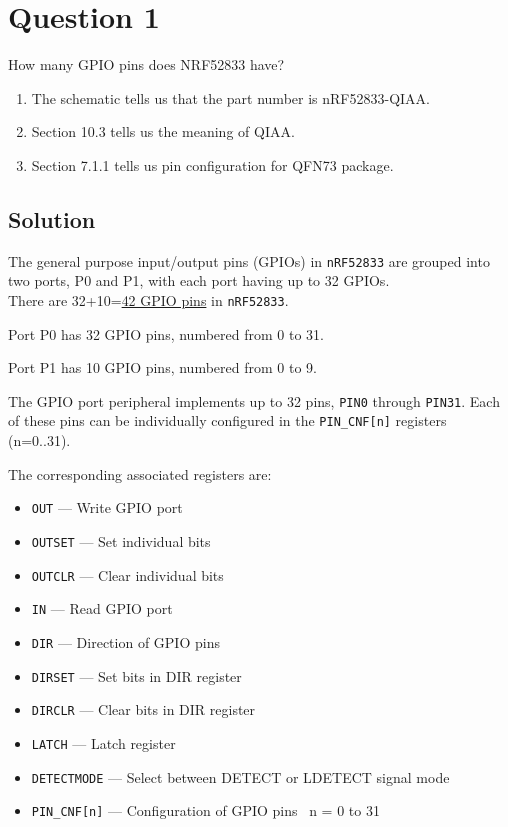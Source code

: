\section*{Question 1}

How many GPIO pins does NRF52833 have?
\begin{enumerate}[label= (\alph*)]
    \item The schematic tells us that the part number is nRF52833-QIAA.\@
    \item Section 10.3 tells us the meaning of QIAA.\@
    \item Section 7.1.1 tells us pin configuration for QFN73 package.
\end{enumerate}

\subsection*{Solution}

The general purpose input/output pins (GPIOs) in \texttt{nRF52833} are grouped into two ports, P0 and P1, with each port having up to 32 GPIOs.\\
There are 32+10=\underline{42 GPIO pins} in \texttt{nRF52833}.

Port P0 has 32 GPIO pins, numbered from 0 to 31.

Port P1 has 10 GPIO pins, numbered from 0 to 9.

The GPIO port peripheral implements up to 32 pins, \texttt{PIN0} through \texttt{PIN31}.
Each of these pins can be individually configured in the \texttt{PIN\_CNF[n]} registers (n=0..31).

The corresponding associated registers are:
\begin{itemize}
    \item \texttt{OUT} --- Write GPIO port
    \item \texttt{OUTSET} --- Set individual bits
    \item \texttt{OUTCLR} --- Clear individual bits
    \item \texttt{IN} --- Read GPIO port
    \item \texttt{DIR} --- Direction of GPIO pins
    \item \texttt{DIRSET} --- Set bits in DIR register
    \item \texttt{DIRCLR} --- Clear bits in DIR register
    \item \texttt{LATCH} --- Latch register
    \item \texttt{DETECTMODE} --- Select between DETECT or LDETECT signal mode
    \item \texttt{PIN\_CNF[n]} --- Configuration of GPIO pins
          \subitem~n = 0 to 31
\end{itemize}

